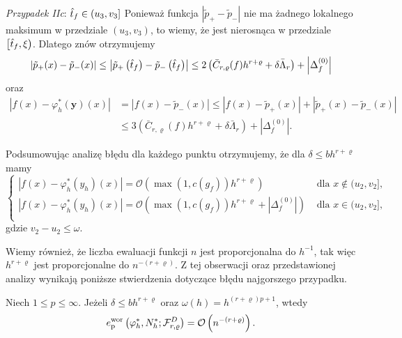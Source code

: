 \documentclass[oik, pdftex, man]{mgrwms}
\begin{document}
    \textit{Przypadek IIc}: $\hat{t}_{f} \in\left(u_{3}, v_{3}\right]$
    Ponieważ funkcja $\left|\tilde{p}_{+}-\tilde{p}_{-}\right|$ nie ma żadnego lokalnego maksimum w przedziale $\left(u_{3}, v_{3}\right)$, to wiemy, że jest nierosnąca w przedziale $\left[\hat{t}_{f}, \xi\right)$. Dlatego znów otrzymujemy
    \begin{equation*}
        \left|\tilde{p}_{+}(x)-\tilde{p}_{-}(x)\right| \leq\left|\tilde{p}_{+}\left(\hat{t}_{f}\right)-\tilde{p}_{-}\left(\hat{t}_{f}\right)\right| \leq 2\left(\bar{C}_{r, \varrho}(f) h^{r+\varrho}+\delta \bar{\Lambda}_{r}\right)+\left|\Delta_{f}^{(0)}\right|
    \end{equation*}
    oraz
    \begin{equation*}
        \begin{aligned}
            \left|f(x)-\varphi_{h}^{*}(\mathbf{y})(x)\right| &=\left|f(x)-\tilde{p}_{-}(x)\right| \leq\left|f(x)-\tilde{p}_{+}(x)\right|+\left|\tilde{p}_{+}(x)-\tilde{p}_{-}(x)\right| \\
            & \leq 3\left(\bar{C}_{r, \varrho}(f) h^{r+\varrho}+\delta \bar{\Lambda}_{r}\right)+\left|\Delta_{f}^{(0)}\right|.
        \end{aligned}
    \end{equation*}

    Podsumowując analizę błędu dla każdego punktu otrzymujemy, że dla $\delta \leq bh^{r+\varrho}$ mamy
    \begin{equation*}
        \begin{cases}
            |f(x) - \varphi_{h}^{*}(y_{h})(x)| = \mathcal{O} (\max(1, c(g_{f})) h^{r+\varrho}) & \text{ dla } x \notin (u_{2}, v_{2}], \\
            |f(x) - \varphi_{h}^{*}(y_{h})(x)| = \mathcal{O} (\max(1, c(g_{f})) h^{r+\varrho} + |\Delta_{f}^{(0)}|) & \text{ dla } x \in (u_{2}, v_{2}], \\
        \end{cases}
    \end{equation*}
    gdzie $v_{2} - u_{2} \leq \omega$.

    Wiemy również, że liczba ewaluacji funkcji $n$ jest proporcjonalna do $h^{-1}$, tak więc $h^{r+\varrho}$ jest proporcjonalne do $n^{-(r+\varrho)}$. Z tej obserwacji oraz przedstawionej analizy wynikają poniższe stwierdzenia dotyczące błędu najgorszego przypadku.

    \begin{stw}
        \label{stw2}
        Niech $1 \leq p \leq \infty$. Jeżeli $\delta \leq bh^{r+\varrho}$ oraz $\omega(h) = h^{(r+\varrho)p + 1}$, wtedy
        \begin{equation*}
            e_{\mathrm{p}}^{\mathrm{wor}}\left(\varphi_{h}^{*}, N_{h}^{*} ; \mathcal{F}_{r, \varrho}^{D}\right)=\mathcal{O}\left(n^{-(r+\varrho)}\right).
        \end{equation*}
    \end{stw}
\end{document}
